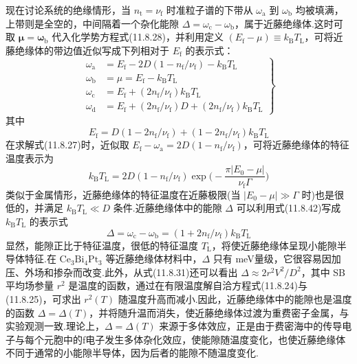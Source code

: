 现在讨论系统的绝缘情形，当 $n_{\mathrm{t}}=\nu_{\mathrm{f}}$ 时准粒子谱的下带从 $\omega_{\mathrm{a}}$ 到 $\omega_{\mathrm{b}}$ 均被填满，上带则是全空的，中间隔着一个杂化能隙 $\Delta=\omega_{\mathrm{c}}-\omega_{\mathrm{b}}$，属于近藤绝缘体.这时可取 $\boldsymbol{\mu}=\boldsymbol{\omega}_{\mathrm{b}}$ 代入化学势方程式(11.8.28)，并利用定义 $(E_{\mathrm{f}}-\mu)\equiv k_{\mathrm{B}}T_{\mathrm{L}}$，可将近藤绝缘体的带边值近似写成下列相对于 $E_{\mathrm{f}}$ 的表示式：
\begin{equation}
\left.\begin{aligned}
  \omega_{\mathrm{a}}&=E_{\mathrm{f}}-2D(1-n_{\mathrm{f}}/\nu_{\mathrm{f}})-k_{\mathrm{B}}T_{\mathrm{L}}\\
  \omega_{\mathrm{b}}&=\mu=E_{\mathrm{f}}-k_{\mathrm{B}}T_{\mathrm{L}}\\
  \omega_{\mathrm{c}}&=E_{\mathrm{f}}+(2n_{\mathrm{f}}/\nu_{\mathrm{f}})k_{\mathrm{B}}T_{\mathrm{L}}\\
  \omega_{\mathrm{d}}&=E_{\mathrm{f}}+(2n_{\mathrm{f}}/\nu_{\mathrm{f}})D+(2n_{\mathrm{f}}/\nu_{\mathrm{f}})k_{\mathrm{B}}T_{\mathrm{L}}
\end{aligned}\right\}
\end{equation}
其中
\begin{equation}
  E_{\mathrm{f}}=D(1-2n_{\mathrm{f}}/\nu_{\mathrm{f}})+(1-2n_{\mathrm{f}}/\nu_{\mathrm{f}})k_{\mathrm{B}}T_{\mathrm{L}}
\end{equation}
在求解式(11.8.27)时，近似取 $E_{\mathrm{f}}-\omega_{\mathrm{a}}=2D(1-n_{\mathrm{f}}/\nu_{\mathrm{f}})$，可将近藤绝缘体的特征温度表示为
\begin{equation}
  k_{\mathrm{B}}T_{\mathrm{L}}=2D(1-n_{\mathrm{f}}/\nu_{\mathrm{f}})
  \exp\biggl(-\frac{\pi|E_{0}-\mu|}{\nu_{\mathrm{f}}\Gamma}\biggr)
\end{equation}
类似于金属情形，近藤绝缘体的特征温度在近藤极限(当 $|E_{0}-\mu|\gg\Gamma$ 时)也是很低的，并满足 $k_{\mathrm{B}}T_{\mathrm{L}}\ll D$ 条件.近藤绝缘体中的能隙 $\Delta$ 可以利用式(11.8.42)写成 $k_{\mathrm{B}}T_{\mathrm{L}}$ 的表示式
\begin{equation}
  \Delta=\omega_{\mathrm{c}}-\omega_{\mathrm{b}}=(1+2n_{\mathrm{f}}/\nu_{\mathrm{f}})k_{\mathrm{B}}T_{\mathrm{L}}
\end{equation}
显然，能隙正比于特征温度，很低的特征温度 $T_{\mathrm{L}}$，将使近藤绝缘体呈现小能隙半导体特征.在 $\mathrm{Ce_{3}Bi_{4}Pt_{3}}$ 等近藤绝缘体材料中，$\Delta$ 只有 meV量级，它很容易因加压、外场和掺杂而改变.此外，从式(11.8.31)还可以看出 $\Delta\approx 2r^{2}V^{2}/D^{2}$，其中 SB 平均场参量 $r^{2}$ 是温度的函数，通过在有限温度解自洽方程式(11.8.24)与(11.8.25)，可求出 $r^{2}(T)$ 随温度升高而减小.因此，近藤绝缘体中的能隙也是温度的函数 $\Delta=\Delta(T)$，并将随升温而消失，使近藤绝缘体过渡为重费密子金属，与实验观测一致.理论上，$\Delta=\Delta(T)$ 来源于多体效应，正是由于费密海中的传导电子与每个元胞中的f电子发生多体杂化效应，使能隙随温度变化，也使近藤绝缘体不同于通常的小能隙半导体，因为后者的能隙不随温度变化.

